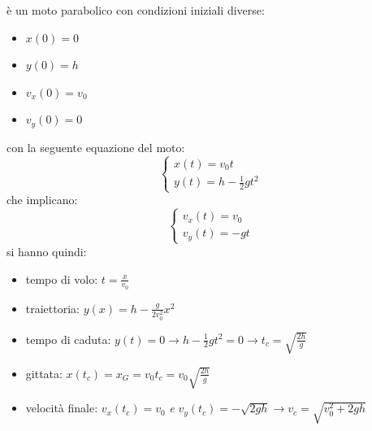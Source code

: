 \documentclass[a4paper,12pt, oneside]{book}
\begin{document}
è un moto parabolico con condizioni iniziali diverse:
\begin{itemize}
	\item $x(0)=0$
	\item $y(0)=h$
	\item $v_x(0)=v_0$
	\item $v_y(0)=0$
\end{itemize}
con la seguente equazione  del moto:
$$\begin{cases}
		x(t)=v_0t \\
		y(t)=h-\frac{1}{2}gt^2
	\end{cases}$$
che implicano:
$$\begin{cases}
		v_x(t)=v_0 \\
		v_y(t)=-gt
	\end{cases}$$
si hanno quindi:
\begin{itemize}
	\item tempo di volo: $t=\frac{x}{v_0}$
	\item traiettoria: $y(x)=h-\frac{g}{2v_0^2}x^2$
	\item tempo di caduta: $y(t)=0\to h-\frac{1}{2}gt^2=0\to t_c=\sqrt{\frac{2h}{g}}$
	\item gittata: $x(t_c)=x_G=v_0t_c=v_0\sqrt{\frac{2h}{g}}$
	\item velocità finale: $v_x(t_c)=v_0$ \textit{e} $v_y(t_c)=-\sqrt{2gh}\to v_c=\sqrt{v_0^2+2gh}$
\end{itemize}
\end{document}

